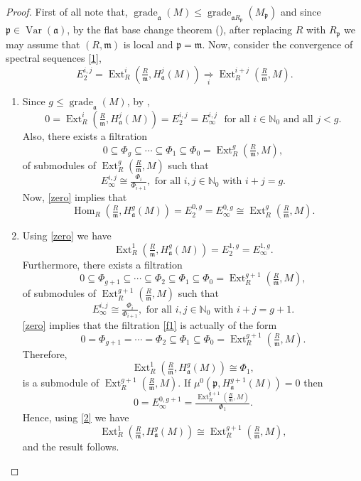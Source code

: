 \documentclass[10pt,a4paper]{amsart}
\def\Ext{\operatorname{Ext}}
\def\Hom{\operatorname{Hom}}
\newcommand{\NN}{\mathbb{N}}
\newcommand{\fa}{\mathfrak{a}}
\def\grade{\operatorname{grade}}
\newcommand{\m}{\mathfrak{m}}
\newcommand{\p}{\mathfrak{p}}
\def\var{\operatorname{Var}}
\begin{document}
\begin{proof}
First of all note that, $\grade_{\fa}(M)\leq \grade_{\fa R_{\p}}(M_{\p})$ and since $\p\in \var(\fa)$, by  the flat base change theorem (\cite[Theorem 4. 3. 2]{bsh}), after replacing $R$ with $R_{\p}$ we may assume that $(R, \m)$ is local and $\p= \m$. Now, consider the convergence of spectral sequences \ref{1},
\[ E_2^{i, j}= \Ext^i_{R }(\tfrac{R}{\m}, H^j_{\fa}(M))\underset{i}{\Rightarrow}\Ext^{i+ j}_{R}(\tfrac{R}{\m}, M).\]
 \begin{enumerate}
     \item Since $g\leq \grade_{\fa}(M)$, by \cite[Theorem 6. 2. 7]{bsh},
     \begin{equation}\label{zero}
       0= \Ext^i_{R }(\tfrac{R}{\m}, H^j_{\fa}(M))= E_2^{i, j}=  E_{\infty}^{i, j} \,\,\,\,\text{for all}\,\,i\in \NN_0\,\,\text{and all}\,\,j< g.
     \end{equation}
     Also, there exists a filtration 
 \[0\subseteq \Phi_{g} \subseteq\cdots\subseteq \Phi_{   1} \subseteq\Phi_{0}= \Ext^{g}_{R}(\tfrac{R}{\m}, M),\]
 of submodules of $\Ext^{g}_{R}(\tfrac{R}{\m}, M)$ such that 
 \begin{equation*}
     E_{\infty}^{i, j}\cong \tfrac{\Phi_{i}}{\Phi_{i+ 1}},\,\,\text{for all}\,\,i, j\in \NN_0\,\,\text{with}\,\,i+ j= g.
 \end{equation*}
 Now, \ref{zero} implies that 
 \[\Hom_{R }(\tfrac{R}{\m}, H^g_{\fa}(M))=  E_2^{0, g}= E_{\infty}^{0, g}\cong  \Ext^{g}_{R}(\tfrac{R}{\m}, M).\]
 \item Using \ref{zero} we have 
 \[\Ext^1_{R }(\tfrac{R}{\m}, H^g_{\fa}(M))= E_2^{1, g}=  E_{\infty}^{1, g}.\]
 Furthermore, there exists a filtration 
 \begin{equation}\label{f1}
     0\subseteq \Phi_{g+ 1} \subseteq\cdots\subseteq \Phi_{   2} \subseteq\Phi_{   1} \subseteq\Phi_{0}= \Ext^{g+ 1}_{R}(\tfrac{R}{\m}, M),
 \end{equation}
 of submodules of $\Ext^{g+ 1}_{R}(\tfrac{R}{\m}, M)$ such that 
 \begin{equation*}
     E_{\infty}^{i, j}\cong \tfrac{\Phi_{i}}{\Phi_{i+ 1}},\,\,\text{for all}\,\,i, j\in \NN_0\,\,\text{with}\,\,i+ j= g+ 1.
 \end{equation*}
 \ref{zero} implies that the filtration \ref{f1} is actually of the form
 \[ 0= \Phi_{g+ 1} =\cdots= \Phi_{   2} \subseteq\Phi_{   1} \subseteq\Phi_{0}= \Ext^{g+ 1}_{R}(\tfrac{R}{\m}, M).\]
 Therefore,
\begin{equation}\label{2}
    \Ext^1_{R }(\tfrac{R}{\m}, H^g_{\fa}(M))\cong \Phi_{   1},
\end{equation}
 is a submodule of $\Ext^{g+ 1}_{R}(\tfrac{R}{\m}, M)$. If $\mu^0(\p, H^{g+ 1}_{\fa}(M))= 0$ then 
 \[0= E_{\infty}^{0, g+ 1}= \tfrac{\Ext^{g+ 1}_{R}(\tfrac{R}{\m}, M)}{\Phi_{  1}}.\]
 Hence, using \ref{2} we have 
 \[ \Ext^1_{R }(\tfrac{R}{\m}, H^g_{\fa}(M))\cong \Ext^{g+ 1}_{R}(\tfrac{R}{\m}, M),\]
 and the result follows.
 

\end{enumerate}
\end{proof}
\end{document}
